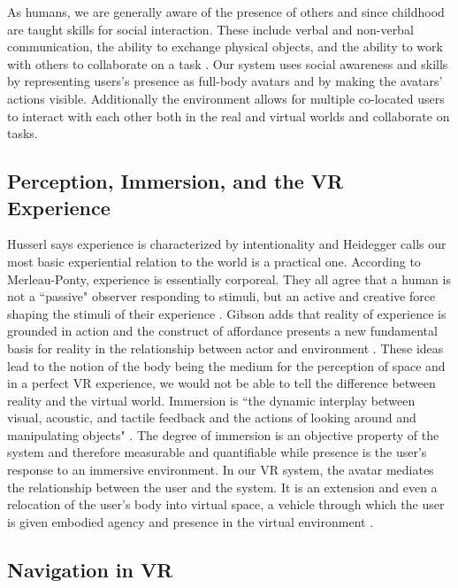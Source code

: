 \documentclass{sigchi}
\begin{document}
As humans, we are generally aware of the presence of others and since childhood are taught skills for social interaction. These include verbal and non-verbal communication, the ability to exchange physical objects, and the ability to work with others to collaborate on a task \cite{jacob2008reality}. Our system uses social awareness and skills by representing users's presence as full-body avatars and by making the avatars' actions visible. Additionally the environment allows for multiple co-located users to interact with each other both in the real and virtual worlds and collaborate on tasks. 


\subsection{Perception, Immersion, and the VR Experience}

Husserl says experience is characterized by intentionality and Heidegger calls our most basic experiential relation to the world is a practical one. According to Merleau-Ponty, experience is essentially corporeal. They all agree that a human is not a ``passive" observer responding to stimuli, but an active and creative force shaping the stimuli of their experience \cite{klevjer2012enter}. Gibson adds that reality of experience is grounded in action and the construct of affordance presents a new fundamental basis for reality in the relationship between actor and environment \cite{sageng2012philosophy}. These ideas lead to the notion of the body being the medium for the perception of space \cite{merleau1996phenomenology} and in a perfect VR experience, we would not be able to tell the difference between reality and the virtual world. Immersion is ``the dynamic interplay between visual, acoustic, and tactile feedback and the actions of looking around and manipulating objects" \cite{gibson2014ecological}. The degree of immersion is an objective property of the system and therefore measurable and quantifiable \cite{slater1999measuring} while presence is the user's response to an immersive environment. In our VR system, the avatar mediates the relationship between the user and the system. It is an extension and even a relocation of the user's body into virtual space, a vehicle through which the user is given embodied agency and presence in the virtual environment \cite{sageng2012philosophy}.

\subsection{Navigation in VR}
\end{document}
